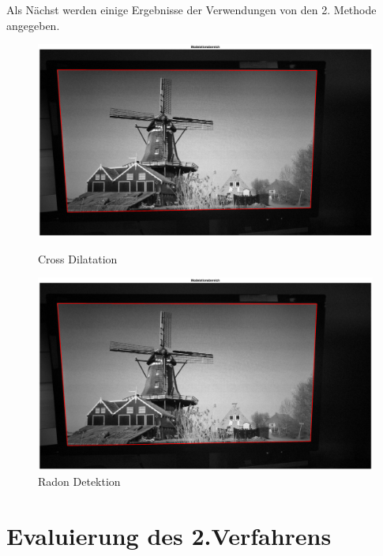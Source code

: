 Als Nächst werden einige Ergebnisse der Verwendungen von den 2. Methode angegeben. 

\begin{figure}[H]
\centering 
\begin{minipage}[b]{0.49\textwidth} 
\centering 
\includegraphics[width=1.0\textwidth]{images/6_Auswertung/Methode1/P1.eps} 
\caption{Cross Dilatation}
\label{fig:cd}
\end{minipage}
\begin{minipage}[b]{0.49\textwidth} 
\centering 
\includegraphics[width=1.0\textwidth]{images/6_Auswertung/Methode1/P1.eps}
\caption{Radon Detektion}
\label{fig:radon}
\end{minipage}
\end{figure}



\section{Evaluierung des 2.Verfahrens}

